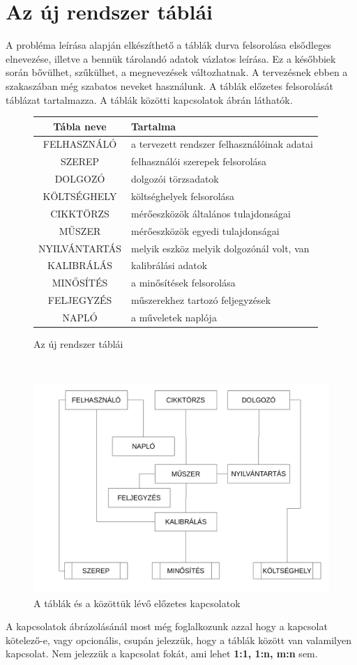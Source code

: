 \documentclass[a4paper,12pt]{report}
\begin{document}
\section{Az új rendszer táblái}
A probléma leírása alapján elkészíthető a táblák durva felsorolása elsődleges 
elnevezése, illetve a bennük tárolandó adatok vázlatos leírása. Ez a későbbiek 
során bővülhet, szűkülhet, a megnevezések változhatnak. A tervezésnek ebben a 
szakaszában még szabatos neveket használunk.
A táblák előzetes felsorolását  táblázat tartalmazza.
A táblák közötti kapcsolatok  ábrán láthatók.
\begin{figure}[ht!]
\centering
\begin{tabular}{|c|l|}
\hline
\textbf{Tábla neve}&\textbf{Tartalma}\\
\hline
FELHASZNÁLÓ & a tervezett rendszer felhasználóinak adatai\\
\hline
SZEREP & felhasználói szerepek felsorolása\\
\hline
DOLGOZÓ & dolgozói törzsadatok\\
\hline
KÖLTSÉGHELY & költséghelyek felsorolása\\
\hline
CIKKTÖRZS & mérőeszközök általános tulajdonságai\\
\hline
MŰSZER & mérőeszközök egyedi tulajdonságai\\
\hline
NYILVÁNTARTÁS & melyik eszköz melyik dolgozónál volt, van\\
\hline
KALIBRÁLÁS & kalibrálási adatok\\
\hline
MINŐSÍTÉS & a minősítések felsorolása\\
\hline
FELJEGYZÉS & műszerekhez tartozó feljegyzések\\
\hline
NAPLÓ & a műveletek naplója\\
\hline
\end{tabular}
\caption{Az új rendszer táblái}\label{tablak-0}
\end{figure}
\\

\begin{figure}[ht!]\label{tablak0-kapcs0}
\centering
\includegraphics[width=13cm]{kepek/tablak0-kapcs0.png}
\caption{A táblák és a közöttük lévő előzetes kapcsolatok}
\end{figure}

A kapcsolatok ábrázolásánál most még foglalkozunk azzal hogy a kapcsolat 
kötelező-e, vagy opcionális, csupán jelezzük, hogy a táblák között van 
valamilyen kapcsolat. Nem jelezzük a kapcsolat fokát, ami lehet \textbf{1:1, 
1:n, m:n} sem.






%
% 
\end{document}
